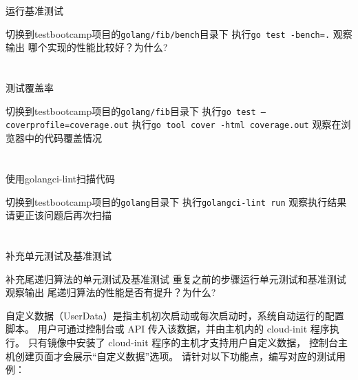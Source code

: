 \documentclass[12pt,addpoints,fleqn]{exam}
\begin{document}
\begin{questions}
\begin{parts}
  \part{}运行基准测试
  \begin{subparts}
    \subpart{}切换到testbootcamp项目的\verb=golang/fib/bench=目录下
    \subpart{}执行\verb#go test -bench=.#
    \subpart{}观察输出
    \subpart{}哪个实现的性能比较好？为什么?
  \end{subparts}

  \part{}测试覆盖率
  \begin{subparts}
    \subpart{}切换到testbootcamp项目的\verb=golang/fib=目录下
    \subpart{}执行\verb#go test –coverprofile=coverage.out#
    \subpart{}执行\verb#go tool cover -html coverage.out#
    \subpart{}观察在浏览器中的代码覆盖情况
  \end{subparts}

  \part{}使用golangci-lint扫描代码
  \begin{subparts}
    \subpart{}切换到testbootcamp项目的\verb=golang=目录下
    \subpart{}执行\verb#golangci-lint run#
    \subpart{}观察执行结果 
    \subpart{}请更正该问题后再次扫描
  \end{subparts}


  \part{}补充单元测试及基准测试
  \begin{subparts}
    \subpart{}补充尾递归算法的单元测试及基准测试
    \subpart{}重复之前的步骤运行单元测试和基准测试
    \subpart{}观察输出
    \subpart{}尾递归算法的性能是否有提升？为什么?
  \end{subparts}

\end{parts}

\newpage
\question[40] 
自定义数据（UserData）是指主机初次启动或每次启动时，系统自动运行的配置脚本。
用户可通过控制台或 API 传入该数据，并由主机内的 cloud-init 程序执行。
只有镜像中安装了 cloud-init 程序的主机才支持用户自定义数据，
控制台主机创建页面才会展示“自定义数据”选项。
请针对以下功能点，编写对应的测试用例：


\end{questions}
\end{document}
